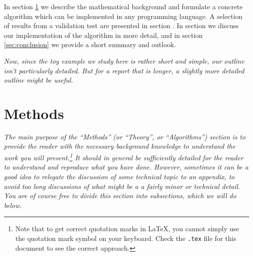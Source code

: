 \documentclass[english,notitlepage,reprint,nofootinbib]{revtex4-1}  %
\begin{document}
In section \ref{sec:methods} we describe the mathematical background and formulate a concrete algorithm which can be implemented in any programming language. A selection of results from a validation test are presented in section \label{sec:results}. In section \label{sec:discussion} we discuss our implementation of the algorithm in more detail, and in section \ref{sec:conclusion} we provide a short summary and outlook.

\textit{Now, since the toy example we study here is rather short and simple, our outline isn't particularly detailed. But for a report that is longer, a slightly more detailed outline might be useful.}


\section{Methods}\label{sec:methods}
%
\textit{The main purpose of the ``Methods'' (or ``Theory'', or ``Algorithms'') section is to provide the reader with the necessary background knowledge to understand the work you will present.\footnote{Note that to get correct quotation marks in LaTeX, you cannot simply use the quotation mark symbol on your keyboard. Check the \texttt{.tex} file for this document to see the correct approach.} It should in general be sufficiently detailed for the reader to understand and reproduce what you have done. However, sometimes it can be a good idea to relegate the discussion of some technical topic to an appendix, to avoid too long discussions of what might be a a fairly minor or technical detail. You are of course free to divide this section into subsections, which we will do below.}
\end{document}
